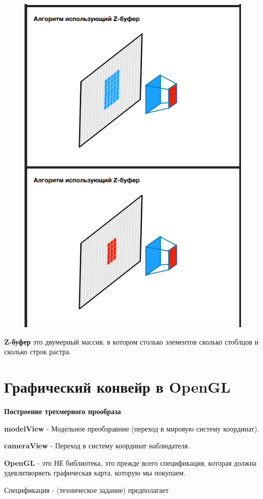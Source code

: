 \documentclass{article}
\begin{document}
\begin{figure} [H]
    \includegraphics[width=0.70\linewidth]{Снимок экрана 2025-05-05 124350.png}
\end{figure}


\textbf{Z-буфер} это двумерный массив, 
в котором столько элементов сколько стоблцов и сколько строк растра.


\section{Графический конвейр в OpenGL}


\textbf{Построение трехмерного прообраза}

\textbf{modelView} - Модельное преобзравние (переход в мировую систему координат).

\textbf{cameraView} - Переход в систему координат наблюдателя.

\textbf{OpenGL} - это НЕ библиотека, это прежде всего спецификация, которая должна
удевлитворяеть графическая карта, которую мы покупаем.

Спецификация - (техническое задание) предполагает
\end{document}
